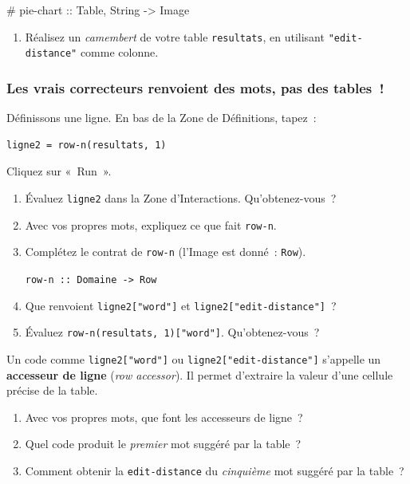 \documentclass[12pt,a4paper]{article}
\newcommand{\contrat}[1]{%
  \begin{contractbox}
    \ttfamily #1
  \end{contractbox}
}
\begin{document}
\contrat{\# pie-chart :: Table, String -> Image}

\begin{activitybox}
  \begin{enumerate}[leftmargin=*, resume]
    \item Réalisez un \emph{camembert} de votre table \texttt{resultats}, en utilisant \texttt{"edit-distance"} comme colonne.
  \end{enumerate}
\end{activitybox}

\subsubsection{Les vrais correcteurs renvoient des mots, pas des tables~!}

Définissons une ligne. En bas de la Zone de Définitions, tapez~:

\begin{lstlisting}
ligne2 = row-n(resultats, 1)
\end{lstlisting}

Cliquez sur «~Run~».

\begin{activitybox}
  \begin{enumerate}[leftmargin=*]
    \item Évaluez \texttt{ligne2} dans la Zone d'Interactions. Qu'obtenez-vous~?
    \item Avec vos propres mots, expliquez ce que fait \texttt{row-n}.
    \item Complétez le contrat de \texttt{row-n} (l'Image est donné~: \texttt{Row}).
    \begin{center}
      \texttt{row-n :: Domaine -> Row}
    \end{center}
    \item Que renvoient \texttt{ligne2["word"]} et \texttt{ligne2["edit-distance"]}~?
    \item Évaluez \texttt{row-n(resultats, 1)["word"]}. Qu'obtenez-vous~?
  \end{enumerate}
\end{activitybox}

Un code comme \texttt{ligne2["word"]} ou \texttt{ligne2["edit-distance"]} s'appelle un \textbf{accesseur de ligne} (\emph{row accessor}). Il permet d'extraire la valeur d'une cellule précise de la table.

\begin{activitybox}
  \begin{enumerate}[leftmargin=*, resume]
    \item Avec vos propres mots, que font les accesseurs de ligne~?
    \item Quel code produit le \emph{premier} mot suggéré par la table~?
    \item Comment obtenir la \texttt{edit-distance} du \emph{cinquième} mot suggéré par la table~?
  \end{enumerate}
\end{activitybox}
\end{document}

